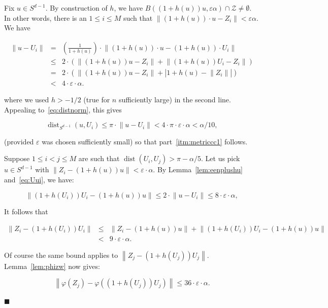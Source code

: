 \documentclass[11pt]{article}%
\newenvironment{proofof}[1]{\vspace{1ex}\noindent{\bf Proof of #1.}}{\hspace*{\fill}$\blacksquare$\vspace{1ex}}
\newcommand{\Zcal}[0]{\ensuremath{{\mathcal Z}}}
\newcommand{\norm}[1]{\ensuremath{\left\|#1\right\|}}
\newcommand{\eps}{\varepsilon}
\DeclareMathOperator{\dist}{dist}
\begin{document}
\begin{proofof}{Corollary~\ref{cor:metriccc}}
Fix $u \in S^{d-1}$. By construction of $h$, we have $B( (1+h(u)) u, \eps \alpha ) \cap \Zcal \neq \emptyset$.
In other words, there is an $1\leq i \leq M$ such that $\norm{ (1+h(u))\cdot u - Z_i } < \eps \alpha$.
We have

\begin{equation}\label{eq:Uui} 
\begin{array}{rcl} 
\norm{u - U_i} 
& = & 
\left(\frac{1}{1+h(u)}\right) \cdot \norm{ (1+h(u))\cdot u - (1+h(u))\cdot U_i} \\[2ex]
& \leq & 
2 \cdot \left( \norm{(1+h(u))u - Z_i} + \norm{(1+h(u))U_i - Z_i} \right) \\[2ex]
& = & 
2 \cdot \left( \norm{(1+h(u))u - Z_i} + \left|1+h(u)-\norm{Z_i}\right| \right) \\[2ex]
& < & 
4 \cdot \eps \cdot \alpha. 
\end{array} \end{equation}

\noindent 
where we used $h>-1/2$ (true for $n$ sufficiently large) in the second line. 
Appealing to~\eqref{eq:distnorm}, this gives

$$ \dist_{S^{d-1}}(u,U_i) \leq \pi \cdot \norm{u - U_i} <  4\cdot\pi\cdot\eps\cdot\alpha < \alpha/10, $$

\noindent
(provided $\eps$ was chosen sufficiently small) so that part~\ref{itm:metriccc1} follows.

\vspace{.5ex}

Suppose $1\leq i<j \leq M$ are such that $\dist(U_i,U_j) > \pi-\alpha/5$.
Let us pick $u \in S^{d-1}$ with $\norm{Z_i - (1+h(u))u} < \eps\cdot\alpha$.
By Lemma~\ref{lem:eenplushu} and~\eqref{eq:Uui}, we have:

$$ \norm{ (1+h(U_i))U_i - (1+h(u))u } \leq  2 \cdot \norm{u-U_i} \leq 8 \cdot \eps \cdot \alpha, $$

\noindent 
It follows that 

$$ \begin{array}{rcl} 
\norm{Z_i-(1+h(U_i))U_i} 
& \leq & \norm{Z_i - (1+h(u))u} + \norm{ (1+h(U_i))U_i - (1+h(u))u } \\
& < & 9 \cdot \eps \cdot \alpha. 
\end{array} $$

\noindent 
Of course the same bound applies to $\norm{Z_j-(1+h(U_j))U_j}$. 
Lemma~\ref{lem:phizw} now gives:

$$ \norm{\varphi(Z_j) - \varphi((1+h(U_j))U_j)} \leq 36 \cdot \eps \cdot \alpha. $$


\end{proofof}
\end{document}
